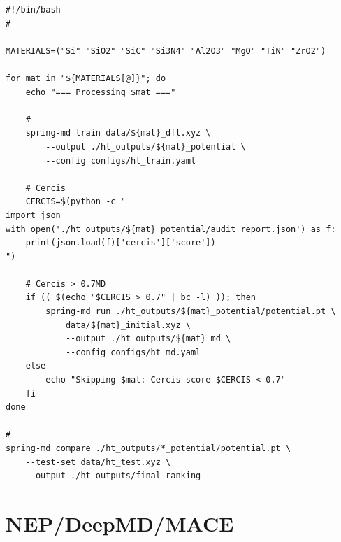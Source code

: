 \documentclass[12pt,a4paper]{article}
\theoremstyle{remark}
\begin{document}
\begin{lstlisting}[caption={},label=lst:high_throughput]
#!/bin/bash
# 

MATERIALS=("Si" "SiO2" "SiC" "Si3N4" "Al2O3" "MgO" "TiN" "ZrO2")

for mat in "${MATERIALS[@]}"; do
    echo "=== Processing $mat ==="

    # 
    spring-md train data/${mat}_dft.xyz \
        --output ./ht_outputs/${mat}_potential \
        --config configs/ht_train.yaml

    # Cercis
    CERCIS=$(python -c "
import json
with open('./ht_outputs/${mat}_potential/audit_report.json') as f:
    print(json.load(f)['cercis']['score'])
")

    # Cercis > 0.7MD
    if (( $(echo "$CERCIS > 0.7" | bc -l) )); then
        spring-md run ./ht_outputs/${mat}_potential/potential.pt \
            data/${mat}_initial.xyz \
            --output ./ht_outputs/${mat}_md \
            --config configs/ht_md.yaml
    else
        echo "Skipping $mat: Cercis score $CERCIS < 0.7"
    fi
done

# 
spring-md compare ./ht_outputs/*_potential/potential.pt \
    --test-set data/ht_test.xyz \
    --output ./ht_outputs/final_ranking
\end{lstlisting}

\newpage

\section{NEP/DeepMD/MACE}

\subsection{}
\end{document}
